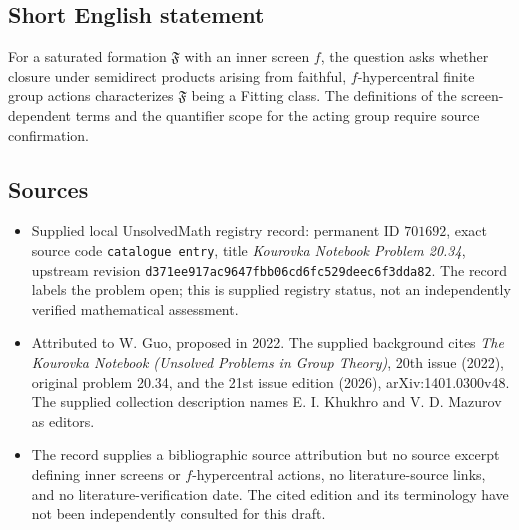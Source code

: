 \documentclass[11pt]{article}
\begin{document}
\subsection{Short English statement}
For a saturated formation \(\mathfrak F\) with an inner screen \(f\), the question asks whether closure under semidirect products arising from faithful, \(f\)-hypercentral finite group actions characterizes \(\mathfrak F\) being a Fitting class. The definitions of the screen-dependent terms and the quantifier scope for the acting group require source confirmation.
\subsection{Sources}
\begin{itemize}
\item Supplied local UnsolvedMath registry record: permanent ID \(701692\), exact source code \texttt{catalogue entry}, title \emph{Kourovka Notebook Problem 20.34}, upstream revision \texttt{d371ee917ac9647fbb06cd6fc529deec6f3dda82}. The record labels the problem open; this is supplied registry status, not an independently verified mathematical assessment.
\item Attributed to W. Guo, proposed in 2022. The supplied background cites \emph{The Kourovka Notebook (Unsolved Problems in Group Theory)}, 20th issue (2022), original problem 20.34, and the 21st issue edition (2026), arXiv:1401.0300v48. The supplied collection description names E. I. Khukhro and V. D. Mazurov as editors.
\item The record supplies a bibliographic source attribution but no source excerpt defining inner screens or \(f\)-hypercentral actions, no literature-source links, and no literature-verification date. The cited edition and its terminology have not been independently consulted for this draft.
\end{itemize}
\end{document}
